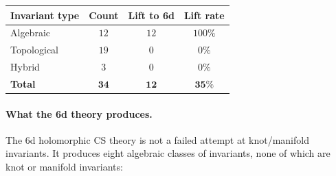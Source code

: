 \begin{center}
\small
\renewcommand{\arraystretch}{1.3}
\begin{tabular}{lccc}
 \toprule
 \textbf{Invariant type} & \textbf{Count} & \textbf{Lift to 6d} & \textbf{Lift rate} \\
 \midrule
 Algebraic & $12$ & $12$ & $100\%$ \\
 Topological & $19$ & $0$ & $0\%$ \\
 Hybrid & $3$ & $0$ & $0\%$ \\
 \midrule
 \textbf{Total} & $\mathbf{34}$ & $\mathbf{12}$ & $\mathbf{35\%}$ \\
 \bottomrule
\end{tabular}
\end{center}

\paragraph{What the 6d theory produces.}
The 6d holomorphic CS theory is not a failed attempt at knot/manifold invariants. It produces eight algebraic classes of invariants, none of which are knot or manifold invariants:
